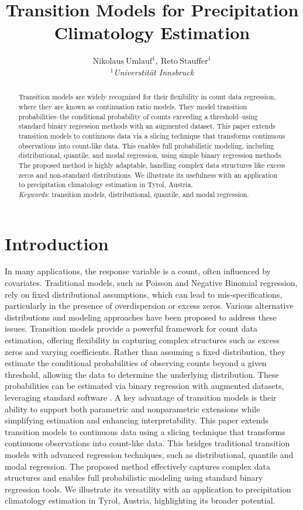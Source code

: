 \documentclass[english,a4paper,11pt]{article}
\date{}
\title{Transition Models for Precipitation Climatology Estimation}
\author{$\mathrm{Nikolaus \ Umlauf}^\mathrm{1},  
	\  \mathrm{Reto \ Stauffer}^\mathrm{1}$\\  
	$^\mathrm{1}$\small{\emph{Universtit\"at Innsbruck}}\\
}
\begin{document}
\maketitle

\begin{abstract}
Transition models are widely recognized for their flexibility in count data regression, where they
are known as continuation ratio models. They model transition probabilities--the conditional
probability of counts exceeding a threshold--using standard binary regression methods with an
augmented dataset.
This paper extends transition models to continuous data via a slicing technique that transforms
continuous observations into count-like data. This enables full probabilistic modeling,
including distributional, quantile, and modal regression, using simple binary regression methods.
The proposed method is highly adaptable, handling complex data structures like excess zeros
and non-standard distributions. We illustrate its usefulness with an application to precipitation
climatology estimation in Tyrol, Austria.
\noindent 
\hspace{1cm}\\
\emph{Keywords}:  transition models, distributional, quantile, and modal regression.
\end{abstract}

\section{Introduction}\label{sec:intro}

In many applications, the response variable is a count, often influenced by covariates.
Traditional models, such as Poisson and Negative Binomial regression, rely on fixed distributional
assumptions, which can lead to mis-specifications, particularly in the presence of overdispersion
or excess zeros. Various alternative distributions and modeling approaches have been proposed to
address these issues.
Transition models provide a powerful framework for count data estimation, offering flexibility
in capturing complex structures such as excess zeros and varying coefficients. Rather than assuming
a fixed distribution, they estimate the conditional probabilities of observing counts beyond a
given threshold, allowing the data to determine the underlying distribution. These probabilities
can be estimated via binary regression with augmented datasets, leveraging standard software
\cite{Berger:2021}. A key advantage of transition models is their ability to support both
parametric and nonparametric extensions while simplifying estimation and enhancing interpretability.
This paper extends transition models to continuous data using a slicing technique that transforms
continuous observations into count-like data. This bridges traditional transition models with
advanced regression techniques, such as distributional, quantile and modal regression. The proposed
method effectively captures complex data structures and enables full probabilistic modeling using
standard binary regression tools. We illustrate its versatility with an application to
precipitation climatology estimation in Tyrol, Austria, highlighting its broader potential.
\end{document}
